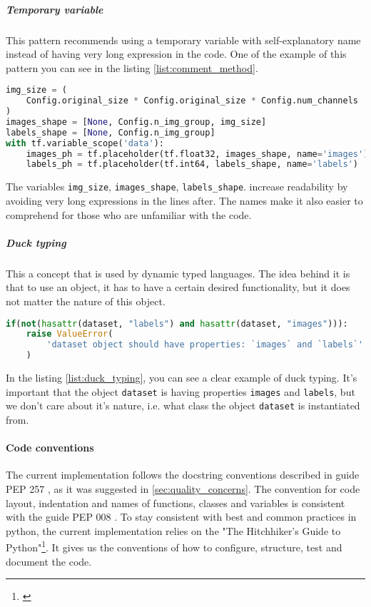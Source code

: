 \subparagraph{Temporary variable} This pattern recommends using a temporary
variable with self-explanatory name instead of having very long expression
in the code. One of the example of this pattern you can see
in the listing \ref{list:comment_method}.

\begin{lstlisting}[language=Python, caption={Method comment example},label={list:comment_method}]
img_size = (
	Config.original_size * Config.original_size * Config.num_channels
)
images_shape = [None, Config.n_img_group, img_size]
labels_shape = [None, Config.n_img_group]
with tf.variable_scope('data'):
	images_ph = tf.placeholder(tf.float32, images_shape, name='images')
	labels_ph = tf.placeholder(tf.int64, labels_shape, name='labels')
\end{lstlisting}

The variables \lstinline{img_size}, \lstinline{images_shape}, \lstinline{labels_shape}.
increase readability by avoiding very long expressions in the lines after.
The names make it also easier to comprehend for those who are unfamiliar
with the code.

\subparagraph{Duck typing} This a concept that is used by dynamic typed languages.
The idea behind it is that to use an object, it has to have a certain desired functionality,
but it does not matter the nature of this object.
\begin{lstlisting}[language=Python, caption={Method comment example},label={list:duck_typing}]
if(not(hasattr(dataset, "labels") and hasattr(dataset, "images"))):
	raise ValueError(
		'dataset object should have properties: `images` and `labels`'
	)
\end{lstlisting}

In the listing \ref{list:duck_typing}, you can see a clear example of duck typing.
It's important that the object \lstinline{dataset} is having properties
\lstinline{images} and \lstinline{labels}, but we don't care about it's nature,
i.e. what class the object \lstinline{dataset} is instantiated from.

\paragraph{Code conventions} The current implementation follows the
docstring conventions described in guide PEP 257 \cite{Goodger2001}, as it was
suggested in \autoref{sec:quality_concerns}. The convention for code layout,
indentation and names of functions, classes and variables is consistent with
the guide PEP 008 \cite{Rossum}. To stay consistent with best and common practices
in python, the current implementation relies on the
"The Hitchhiker’s Guide to Python"\footnote{\cite{Reitz}}. It gives us
the conventions of how to configure, structure, test and document the code.

